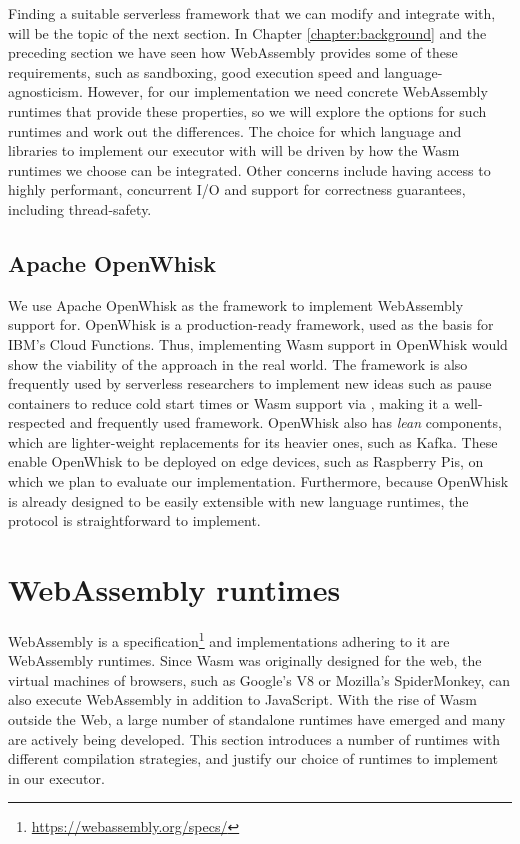 Finding a suitable serverless framework that we can modify and integrate with, will be the topic of the next section. In Chapter \ref{chapter:background} and the preceding section we have seen how WebAssembly provides some of these requirements, such as sandboxing, good execution speed and language-agnosticism. However, for our implementation we need concrete WebAssembly runtimes that provide these properties, so we will explore the options for such runtimes and work out the differences. The choice for which language and libraries to implement our executor with will be driven by how the Wasm runtimes we choose can be integrated. Other concerns include having access to highly performant, concurrent I/O and support for correctness guarantees, including thread-safety.

\subsection{Apache OpenWhisk}

We use Apache OpenWhisk as the framework to implement WebAssembly support for. OpenWhisk is a production-ready framework, used as the basis for IBM's Cloud Functions. Thus, implementing Wasm support in OpenWhisk would show the viability of the approach in the real world. The framework is also frequently used by serverless researchers to implement new ideas such as pause containers to reduce cold start times \cite{Mohan2019} or Wasm support via  \cite{Hall2019}, making it a well-respected and frequently used framework. OpenWhisk also has \emph{lean} components, which are lighter-weight replacements for its heavier ones, such as Kafka. These enable OpenWhisk to be deployed on edge devices, such as Raspberry Pis, on which we plan to evaluate our implementation. Furthermore, because OpenWhisk is already designed to be easily extensible with new language runtimes, the protocol is straightforward to implement.

\section{WebAssembly runtimes}
\label{section:wasm-runtimes}

WebAssembly is a specification\footnote{\url{https://webassembly.org/specs/}} and implementations adhering to it are WebAssembly runtimes. Since Wasm was originally designed for the web, the virtual machines of browsers, such as Google's V8 or Mozilla's SpiderMonkey, can also execute WebAssembly in addition to JavaScript. With the rise of Wasm outside the Web, a large number of standalone runtimes have emerged and many are actively being developed. This section introduces a number of runtimes with different compilation strategies, and justify our choice of runtimes to implement in our executor.


